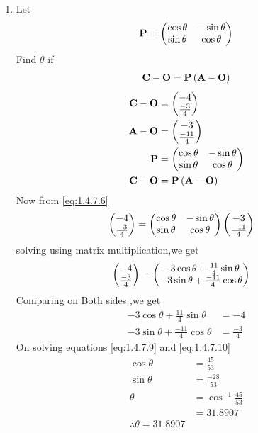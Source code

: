 \documentclass[11pt]{book}
\begin{document}
\begin{enumerate}[label=\thesection.\arabic*.,ref=\thesection.\theenumi]
\item Let 
\begin{align}
\mathbf{P} = \begin{pmatrix}\cos \theta & -\sin \theta \\ \sin \theta & \cos \theta\end{pmatrix}
\end{align}
Find $\theta$ if 
\begin{align}
\mathbf{C}-\mathbf{O}=\mathbf{P}\left(\mathbf{A}-\mathbf{O}\right)
\end{align}
\solution
\begin{align}
    \vec{C}-\vec{O}
          & =\myvec{-4\\\frac{-3}{4}}\\
\vec{A}-\vec{O}
         & =\myvec{-3\\\frac{-11}{4}}
	  \\
\vec{P} &= \myvec{\cos \theta & -\sin \theta \\ \sin \theta & \cos \theta} \\
   \vec{C}-\vec{O}&=\vec{P}\brak{\vec{A}-\vec{O}} \label{eq:1.4.7.6}
\end{align}
 Now from \eqref{eq:1.4.7.6}
 \begin{align}
 \begin{pmatrix}-4\\\frac{-3}{4}\end{pmatrix}&= \begin{pmatrix}\cos \theta & -\sin \theta \\ \sin \theta & \cos \theta\end{pmatrix} \begin{pmatrix}-3\\\frac{-11}{4}\end{pmatrix}    
 \end{align}
solving using matrix multiplication,we get
\begin{align}
    \begin{pmatrix}-4\\\frac{-3}{4}\end{pmatrix}&=\begin{pmatrix} -3\cos\theta + \frac{11}{4}\sin\theta \\ -3\sin\theta + \frac{-11}{4}\cos\theta\end{pmatrix}
\end{align}
Comparing on Both sides ,we get
\begin{align}
     -3\cos\theta + \frac{11}{4}\sin\theta &= -4   \label{eq:1.4.7.9}\\
 -3\sin\theta + \frac{-11}{4}\cos\theta &= \frac{-3}{4} \label{eq:1.4.7.10}
\end{align}
On solving equations \eqref{eq:1.4.7.9}  and \eqref{eq:1.4.7.10}
\begin{align}
    \cos\theta&= \frac{45}{53} \\
    \sin\theta&= \frac{-28}{53} \\
    \theta &=\cos^{-1}\frac{45}{53} \\
            &= 31.8907 \\
            \therefore \theta = 31.8907
\end{align}
\end{enumerate}
\end{document}
